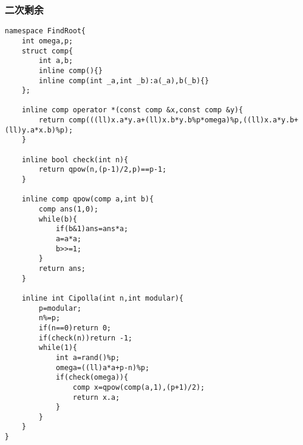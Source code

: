 \documentclass{ctexart}
\begin{document}
\subsubsection{二次剩余}
\begin{lstlisting}
namespace FindRoot{
    int omega,p;
    struct comp{
        int a,b;
        inline comp(){}
        inline comp(int _a,int _b):a(_a),b(_b){}
    };

    inline comp operator *(const comp &x,const comp &y){
        return comp(((ll)x.a*y.a+(ll)x.b*y.b%p*omega)%p,((ll)x.a*y.b+(ll)y.a*x.b)%p);
    }

    inline bool check(int n){
        return qpow(n,(p-1)/2,p)==p-1;
    }

    inline comp qpow(comp a,int b){
        comp ans(1,0);
        while(b){
            if(b&1)ans=ans*a;
            a=a*a;
            b>>=1;
        }
        return ans;
    }

    inline int Cipolla(int n,int modular){
        p=modular;
        n%=p;
        if(n==0)return 0;
        if(check(n))return -1;
        while(1){
            int a=rand()%p;
            omega=((ll)a*a+p-n)%p;
            if(check(omega)){
                comp x=qpow(comp(a,1),(p+1)/2);
                return x.a;
            }
        }
    }
}
\end{lstlisting}
\end{document}
